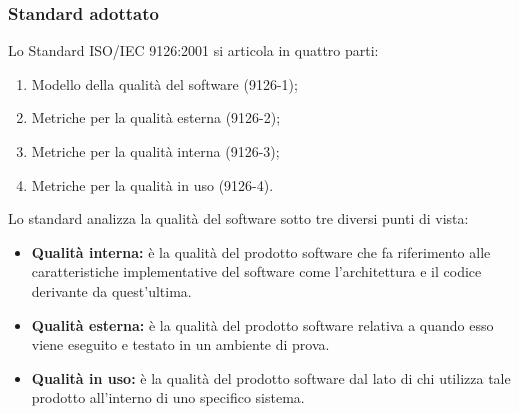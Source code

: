 	\subsubsection{Standard adottato}
	Lo Standard ISO/IEC 9126:2001 si articola in quattro parti:
		\begin{enumerate}
		\item Modello della qualità del software (9126-1);
			\item Metriche per la qualità esterna (9126-2);
			\item Metriche per la qualità interna (9126-3);
			\item Metriche per la qualità in uso (9126-4).
		\end{enumerate}
		Lo standard analizza la qualità del software sotto tre diversi punti di vista:
		\begin{itemize}
			\item \textbf{Qualità interna:} è la qualità del prodotto software che fa riferimento alle caratteristiche implementative del software come l'architettura e il codice derivante da quest'ultima.
			\item \textbf{Qualità esterna:} è la qualità del prodotto software relativa a quando esso viene eseguito e testato in un ambiente di prova. 
			\item \textbf{Qualità in uso:} è la qualità del prodotto software dal lato di chi utilizza tale prodotto all'interno di uno specifico sistema.
		\end{itemize}
